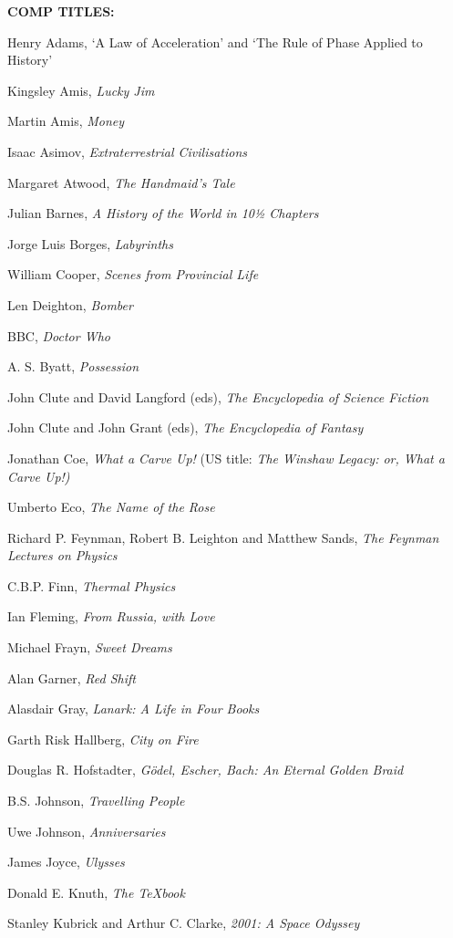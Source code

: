 {\bf COMP TITLES:}\par
Henry Adams, ‘A Law of Acceleration’ and ‘The Rule of Phase Applied to History’\par
Kingsley Amis, {\sl Lucky Jim}\par
Martin Amis, {\sl Money}\par
Isaac Asimov, {\sl Extraterrestrial Civilisations}\par
Margaret Atwood, {\sl The Handmaid's Tale}\par
Julian Barnes, {\sl A History of the World in 10½ Chapters}\par
Jorge Luis Borges, {\sl Labyrinths}\par
William Cooper, {\sl Scenes from Provincial Life}\par
Len Deighton, {\sl Bomber}\par
BBC, {\sl Doctor Who}\par
A. S. Byatt, {\sl Possession}\par
John Clute and David Langford (eds), {\sl The Encyclopedia of Science Fiction}\par
John Clute and John Grant (eds), {\sl The Encyclopedia of Fantasy}\par
Jonathan Coe, {\sl What a Carve Up!} (US title: {\sl The Winshaw Legacy: or, What a Carve Up!)}\par
Umberto Eco, {\sl The Name of the Rose}\par
Richard P. Feynman, Robert B. Leighton and Matthew Sands, {\sl The Feynman Lectures on Physics}\par
C.B.P. Finn, {\sl Thermal Physics}\par
Ian Fleming, {\sl From Russia, with Love}\par
Michael Frayn, {\sl Sweet Dreams}\par
Alan Garner, {\sl Red Shift}\par
Alasdair Gray, {\sl Lanark: A Life in Four Books}\par
Garth Risk Hallberg, {\sl City on Fire}\par
Douglas R. Hofstadter, {\sl Gödel, Escher, Bach: An Eternal Golden Braid}\par
B.S. Johnson, {\sl Travelling People}\par
Uwe Johnson, {\sl Anniversaries}\par
James Joyce, {\sl Ulysses}\par
Donald E. Knuth, {\sl The \TeX book}\par
Stanley Kubrick and Arthur C. Clarke, {\sl 2001: A Space Odyssey}\par
